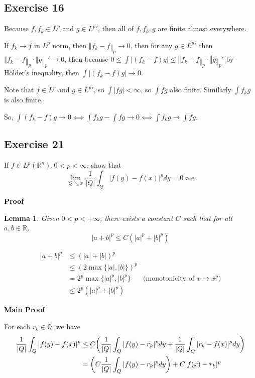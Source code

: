 \documentclass{article}
\DeclarePairedDelimiter{\tuple}{(}{)}
\newtheorem{lemma}{Lemma}
\newcommand\Q{\mathbb{Q}}
\newcommand\R{\mathbb{R}}
\begin{document}
\subsection{Exercise 16}%

\typstmathinputenable{\$}

Because $f, f_k ∈ L^p$ and $g ∈ L^p'$, then all of $f, f_k, g$ are finite almost everywhere.

If $f_k → f$ in $L^p$ norm, then $‖f_k-f‖_p → 0$, then for any $g ∈ L^p'$ then $‖f_k-f‖_p ⋅ ‖g‖_p' → 0$, then because $0 ≤ ∫ |(f_k-f) g| ≤ ‖f_k-f‖_p ⋅‖g‖_p'$ by Hölder's inequality, then $∫ |(f_k-f) g|→ 0$.

Note that $f ∈ L^p$ and $g ∈ L^p'$, so $∫ |f g|<∞$, so $∫ f g$ also finite. Similarly $∫ f_k g$ is also finite.

So, $∫ (f_k-f) g → 0 ⟺ ∫ f_k g - ∫ f g → 0 ⟺ ∫ f_k g → ∫ f g$.

\typstmathinputdisable{\$}
\subsection{Exercise 21} %
If $f \in L^p(\R^n), 0 < p < \infty$, show that
\[
    \lim_{Q \searrow
    x} \frac{1}{|Q|} \int_Q |f(y) - f(x)|^p dy = 0 \text{ a.e}
\]

\textbf{Proof}


\begin{lemma}
    \label{lemma_8.21.1}
    Given $0 < p < +\infty$, there exists a constant $C$ such that for all $a, b \in \R$,
    \[
        |a + b|^p \leq C(|a|^p + |b|^p)
    \]
\end{lemma}

\begin{align*}
    |a+b|^p
    &\leq (|a| + |b|)^p \\
    &\leq (2 \max \{|a|, |b| \})^p \\
    &= 2^p \max \{|a|^p, |b|^p \} &\text{(monotonicity of $x \mapsto x^p$)} \\
    &\leq 2^p (|a|^p + |b|^p)
\end{align*}

\textbf{Main Proof}

For each $r_k \in \Q$, we have 
\begin{align*}
    \frac{1}{|Q|} \int_Q |f(y) - f(x)|^p
    &\leq C \tuple*{\frac{1}{|Q|} \int_Q |f(y) - r_k|^p dy + \frac{1}{|Q|} \int_Q |r_k - f(x)|^p dy } \\
    &= \tuple*{C \frac{1}{|Q|} \int_Q |f(y) - r_k|^p dy} + C|f(x) - r_k|^p
\end{align*}
\end{document}
